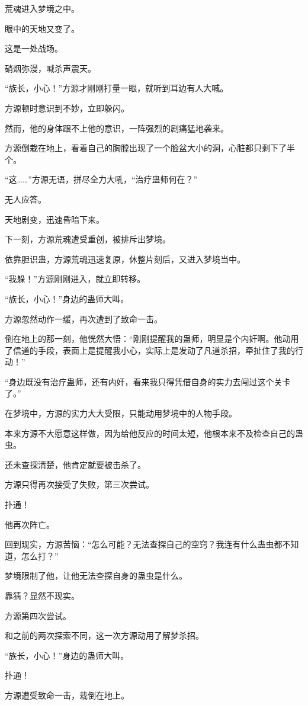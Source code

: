 \begin{this_body}
荒魂进入梦境之中。

眼中的天地又变了。

这是一处战场。

硝烟弥漫，喊杀声震天。

“族长，小心！”方源才刚刚打量一眼，就听到耳边有人大喊。

方源顿时意识到不妙，立即躲闪。

然而，他的身体跟不上他的意识，一阵强烈的剧痛猛地袭来。

方源倒栽在地上，看着自己的胸膛出现了一个脸盆大小的洞，心脏都只剩下了半个。

“这……”方源无语，拼尽全力大吼，“治疗蛊师何在？”

无人应答。

天地剧变，迅速昏暗下来。

下一刻，方源荒魂遭受重创，被排斥出梦境。

依靠胆识蛊，方源荒魂迅速复原，休整片刻后，又进入梦境当中。

“我躲！”方源刚刚进入，就立即转移。

“族长，小心！”身边的蛊师大叫。

方源忽然动作一缓，再次遭到了致命一击。

倒在地上的那一刻，他恍然大悟：“刚刚提醒我的蛊师，明显是个内奸啊。他动用了信道的手段，表面上是提醒我小心，实际上是发动了凡道杀招，牵扯住了我的行动！”

“身边既没有治疗蛊师，还有内奸，看来我只得凭借自身的实力去闯过这个关卡了。”

在梦境中，方源的实力大大受限，只能动用梦境中的人物手段。

本来方源不大愿意这样做，因为给他反应的时间太短，他根本来不及检查自己的蛊虫。

还未查探清楚，他肯定就要被击杀了。

方源只得再次接受了失败，第三次尝试。

扑通！

他再次阵亡。

回到现实，方源苦恼：“怎么可能？无法查探自己的空窍？我连有什么蛊虫都不知道，怎么打？”

梦境限制了他，让他无法查探自身的蛊虫是什么。

靠猜？显然不现实。

方源第四次尝试。

和之前的两次探索不同，这一次方源动用了解梦杀招。

“族长，小心！”身边的蛊师大叫。

扑通！

方源遭受致命一击，栽倒在地上。


\end{this_body}
